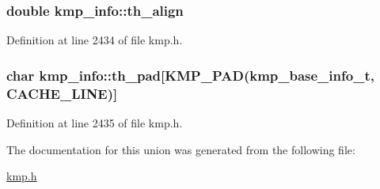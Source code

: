 \hypertarget{unionkmp__info_a816bfe419e64ada867f448d2df78064d}{
\subsubsection[{th\-\_\-align}]{\setlength{\rightskip}{0pt plus 5cm}double kmp\-\_\-info\-::th\-\_\-align}}\label{unionkmp__info_a816bfe419e64ada867f448d2df78064d}


Definition at line 2434 of file kmp.\-h.

\hypertarget{unionkmp__info_a75cad87b55644b8444fb04cb630abc74}{
\subsubsection[{th\-\_\-pad}]{\setlength{\rightskip}{0pt plus 5cm}char kmp\-\_\-info\-::th\-\_\-pad\mbox{[}{\bf K\-M\-P\-\_\-\-P\-A\-D}({\bf kmp\-\_\-base\-\_\-info\-\_\-t}, {\bf C\-A\-C\-H\-E\-\_\-\-L\-I\-N\-E})\mbox{]}}}\label{unionkmp__info_a75cad87b55644b8444fb04cb630abc74}


Definition at line 2435 of file kmp.\-h.



The documentation for this union was generated from the following file\-:\begin{DoxyCompactItemize}
\item 
\hyperlink{kmp_8h}{kmp.\-h}\end{DoxyCompactItemize}
